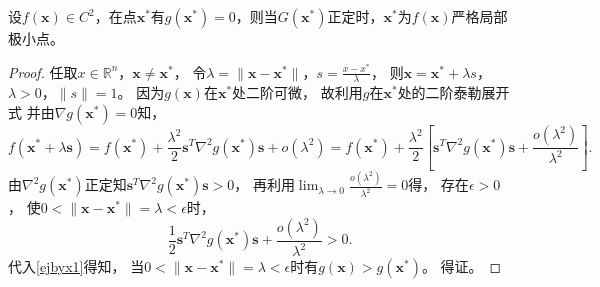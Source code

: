     \begin{theorem}[二阶充分条件]
        设$f(\bm{x})\in C^2$，在点$\bm{x}^*$有$g(\bm{x}^*)=0$，则当$G(\bm{x}^*)$正定时，$\bm{x}^*$为$f(\bm{x})$严格局部极小点。
    \end{theorem}
    \begin{proof}
        任取$x\in\mathbb{R}^n$，$\bm{x}\neq \bm{x}^*$，
        令$\lambda = \|\bm{x} - \bm{x}^*\|$，$s = \displaystyle\frac{x - x^*}{\lambda}$，
        则$\bm{x} = \bm{x}^* + \lambda s$，$\lambda > 0$，$\|s\|=1$。
        因为$g(\bm{x})$在$\bm{x}^*$处二阶可微，
        故利用$g$在$\bm{x}^*$处的二阶泰勒展开式
        并由$\nabla g(\bm{x}^*)=0$知，
        \begin{equation}
            f(\bm{x}^*+\lambda\bm{s}) = 
            f(\bm{x}^*) + \displaystyle\frac{\lambda^2}{2}\bm{s}^T\nabla^2g(\bm{x}^*)\bm{s} + o(\lambda^2) = 
            f(\bm{x}^*) + \displaystyle\frac{\lambda^2}{2}\left[\bm{s}^T\nabla^2g(\bm{x}^*)\bm{s} + \displaystyle\frac{o(\lambda^2)}{\lambda^2}\right] .
            \label{ejbyx1}
        \end{equation}
        由$\nabla^2g(\bm{x}^*)$正定知$\bm{s}^T\nabla^2g(\bm{x}^*)\bm{s} > 0$，
        再利用$\displaystyle\lim_{\lambda\to0}\frac{o(\lambda^2)}{\lambda^2} = 0$得，
        存在$\epsilon > 0$，
        使$0 < \|\bm{x} - \bm{x}^*\| = \lambda < \epsilon$时，
        \begin{equation*}
            \displaystyle\frac{1}{2}\bm{s}^T\nabla^2g(\bm{x}^*)\bm{s} + \displaystyle\frac{o(\lambda^2)}{\lambda^2} >  0  .        
        \end{equation*}
        代入\ref{ejbyx1}得知，
        当$0 < \|\bm{x} - \bm{x}^*\| = \lambda < \epsilon$时有$g(\bm{x}) > g(\bm{x}^*)$。
        得证。
    \end{proof}

